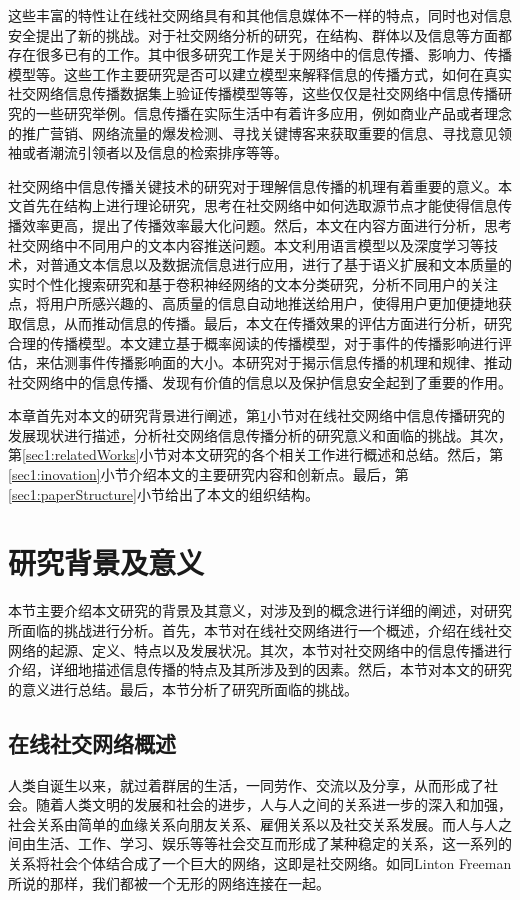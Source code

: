 这些丰富的特性让在线社交网络具有和其他信息媒体不一样的特点，同时也对信息安全提出了新的挑战。对于社交网络分析的研究，在结构、群体以及信息等方面都存在很多已有的工作。其中很多研究工作是关于网络中的信息传播、影响力、传播模型等。这些工作主要研究是否可以建立模型来解释信息的传播方式，如何在真实社交网络信息传播数据集上验证传播模型等等，这些仅仅是社交网络中信息传播研究的一些研究举例。信息传播在实际生活中有着许多应用，例如商业产品或者理念的推广营销、网络流量的爆发检测、寻找关键博客来获取重要的信息、寻找意见领袖或者潮流引领者以及信息的检索排序等等。

社交网络中信息传播关键技术的研究对于理解信息传播的机理有着重要的意义。本文首先在结构上进行理论研究，思考在社交网络中如何选取源节点才能使得信息传播效率更高，提出了传播效率最大化问题。然后，本文在内容方面进行分析，思考社交网络中不同用户的文本内容推送问题。本文利用语言模型以及深度学习等技术，对普通文本信息以及数据流信息进行应用，进行了基于语义扩展和文本质量的实时个性化搜索研究和基于卷积神经网络的文本分类研究，分析不同用户的关注点，将用户所感兴趣的、高质量的信息自动地推送给用户，使得用户更加便捷地获取信息，从而推动信息的传播。最后，本文在传播效果的评估方面进行分析，研究合理的传播模型。本文建立基于概率阅读的传播模型，对于事件的传播影响进行评估，来估测事件传播影响面的大小。本研究对于揭示信息传播的机理和规律、推动社交网络中的信息传播、发现有价值的信息以及保护信息安全起到了重要的作用。

本章首先对本文的研究背景进行阐述，第\ref{sec1:background}小节对在线社交网络中信息传播研究的发展现状进行描述，分析社交网络信息传播分析的研究意义和面临的挑战。其次，第\ref{sec1:relatedWorks}小节对本文研究的各个相关工作进行概述和总结。然后，第\ref{sec1:inovation}小节介绍本文的主要研究内容和创新点。最后，第\ref{sec1:paperStructure}小节给出了本文的组织结构。

\section{研究背景及意义}
\label{sec1:background}
本节主要介绍本文研究的背景及其意义，对涉及到的概念进行详细的阐述，对研究所面临的挑战进行分析。首先，本节对在线社交网络进行一个概述，介绍在线社交网络的起源、定义、特点以及发展状况。其次，本节对社交网络中的信息传播进行介绍，详细地描述信息传播的特点及其所涉及到的因素。然后，本节对本文的研究的意义进行总结。最后，本节分析了研究所面临的挑战。
\subsection{在线社交网络概述}
\label{subsec1:introduction}
人类自诞生以来，就过着群居的生活，一同劳作、交流以及分享，从而形成了社会。随着人类文明的发展和社会的进步，人与人之间的关系进一步的深入和加强，社会关系由简单的血缘关系向朋友关系、雇佣关系以及社交关系发展。而人与人之间由生活、工作、学习、娱乐等等社会交互而形成了某种稳定的关系，这一系列的关系将社会个体结合成了一个巨大的网络，这即是社交网络。如同Linton Freeman所说的那样，我们都被一个无形的网络连接在一起。

